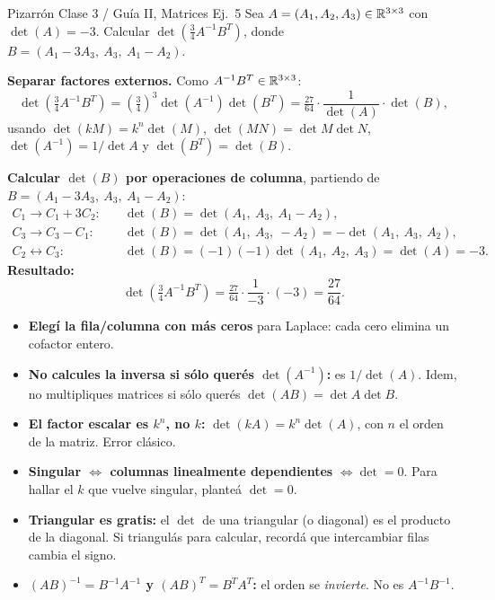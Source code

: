 \begin{ejemplo}{Pizarrón Clase 3 / Guía II, Matrices Ej.\ 5}
Sea $A = (A_1, A_2, A_3) \in \mathbb{R}^{3\times3}$ con $\det(A) = -3$. Calcular $\det\!\left(\tfrac{3}{4}A^{-1}B^T\right)$, donde $B = (A_1 - 3A_3,\ A_3,\ A_1 - A_2)$.

\smallskip
\textbf{Separar factores externos.} Como $A^{-1}B^T \in \mathbb{R}^{3\times3}$:
\[
\det\!\left(\tfrac{3}{4}A^{-1}B^T\right) = \left(\tfrac{3}{4}\right)^3 \det(A^{-1})\det(B^T) = \tfrac{27}{64}\cdot\frac{1}{\det(A)}\cdot\det(B),
\]
usando $\det(kM)=k^n\det(M)$, $\det(MN)=\det M\det N$, $\det(A^{-1})=1/\det A$ y $\det(B^T)=\det(B)$.

\smallskip
\textbf{Calcular $\det(B)$ por operaciones de columna}, partiendo de $B = (A_1-3A_3,\ A_3,\ A_1-A_2)$:
\begin{align*}
C_1 \to C_1 + 3C_2:\quad &\det(B) = \det(A_1,\ A_3,\ A_1 - A_2), \\
C_3 \to C_3 - C_1:\quad &\det(B) = \det(A_1,\ A_3,\ -A_2) = -\det(A_1,\ A_3,\ A_2), \\
C_2 \leftrightarrow C_3:\quad &\det(B) = (-1)(-1)\det(A_1,\ A_2,\ A_3) = \det(A) = -3.
\end{align*}
\textbf{Resultado:}
\[
\det\!\left(\tfrac{3}{4}A^{-1}B^T\right) = \tfrac{27}{64}\cdot\frac{1}{-3}\cdot(-3) = \frac{27}{64}.
\]
\end{ejemplo}

\begin{truco}
\begin{itemize}
  \item \textbf{Elegí la fila/columna con más ceros} para Laplace: cada cero elimina un cofactor entero.
  \item \textbf{No calcules la inversa si sólo querés $\det(A^{-1})$:} es $1/\det(A)$. Idem, no multipliques matrices si sólo querés $\det(AB) = \det A\det B$.
  \item \textbf{El factor escalar es $k^n$, no $k$:} $\det(kA) = k^n\det(A)$, con $n$ el orden de la matriz. Error clásico.
  \item \textbf{Singular $\iff$ columnas linealmente dependientes} $\iff \det=0$. Para hallar el $k$ que vuelve singular, planteá $\det=0$.
  \item \textbf{Triangular es gratis:} el $\det$ de una triangular (o diagonal) es el producto de la diagonal. Si triangulás para calcular, recordá que intercambiar filas cambia el signo.
  \item \textbf{$(AB)^{-1} = B^{-1}A^{-1}$ y $(AB)^T = B^T A^T$:} el orden se \emph{invierte}. No es $A^{-1}B^{-1}$.
\end{itemize}
\end{truco}
